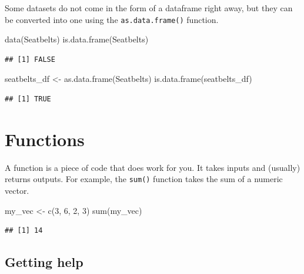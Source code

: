 \documentclass[
]{book}
\newenvironment{Shaded}{\begin{snugshade}}{\end{snugshade}}
\newcommand{\DecValTok}[1]{\textcolor[rgb]{0.00,0.00,0.81}{#1}}
\newcommand{\FunctionTok}[1]{\textcolor[rgb]{0.00,0.00,0.00}{#1}}
\newcommand{\NormalTok}[1]{#1}
\newcommand{\OtherTok}[1]{\textcolor[rgb]{0.56,0.35,0.01}{#1}}
\begin{document}
Some datasets do not come in the form of a dataframe right away, but they can be converted into one using the \texttt{as.data.frame()} function.

\begin{Shaded}
\begin{Highlighting}[]
\FunctionTok{data}\NormalTok{(Seatbelts)}
\FunctionTok{is.data.frame}\NormalTok{(Seatbelts)}
\end{Highlighting}
\end{Shaded}

\begin{verbatim}
## [1] FALSE
\end{verbatim}

\begin{Shaded}
\begin{Highlighting}[]
\NormalTok{seatbelts\_df }\OtherTok{\textless{}{-}} \FunctionTok{as.data.frame}\NormalTok{(Seatbelts)}
\FunctionTok{is.data.frame}\NormalTok{(seatbelts\_df)}
\end{Highlighting}
\end{Shaded}

\begin{verbatim}
## [1] TRUE
\end{verbatim}

\hypertarget{functions}{%
\section{Functions}\label{functions}}

A function is a piece of code that does work for you. It takes inputs and (usually) returns outputs. For example, the \texttt{sum()} function takes the sum of a numeric vector.

\begin{Shaded}
\begin{Highlighting}[]
\NormalTok{my\_vec }\OtherTok{\textless{}{-}} \FunctionTok{c}\NormalTok{(}\DecValTok{3}\NormalTok{, }\DecValTok{6}\NormalTok{, }\DecValTok{2}\NormalTok{, }\DecValTok{3}\NormalTok{)}
\FunctionTok{sum}\NormalTok{(my\_vec)}
\end{Highlighting}
\end{Shaded}

\begin{verbatim}
## [1] 14
\end{verbatim}

\hypertarget{getting-help}{%
\subsection{Getting help}\label{getting-help}}
\end{document}
